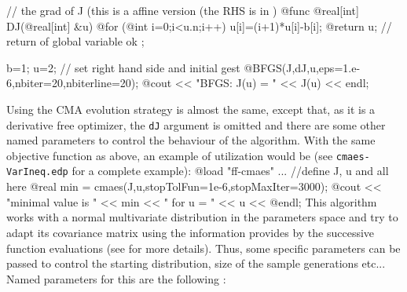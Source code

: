 \documentclass[a4paper,twoside,12pt]{book}
\begin{document}
//  the grad of J (this is a affine version (the RHS is in  )
  @func @real[int] DJ(@real[int] &u)
    {
      @for (@int i=0;i<u.n;i++)
        u[i]=(i+1)*u[i]-b[i];
      @return u;  // return of global variable ok
    };

  b=1; u=2; // set  right hand side and initial gest
  @BFGS(J,dJ,u,eps=1.e-6,nbiter=20,nbiterline=20);
  @cout << "BFGS: J(u) = " << J(u) << endl;

\eFF

Using the CMA evolution strategy is almost the same, except that, as it is
a derivative free optimizer, the \texttt{dJ} argument is omitted and there are
some other named parameters to control the behaviour of the algorithm. With the same 
objective function as above, an example of utilization would be (see \texttt{cmaes-VarIneq.edp} for a complete example):
\bFF
  @load "ff-cmaes"
  ... //define J, u and all here
  @real min = cmaes(J,u,stopTolFun=1e-6,stopMaxIter=3000);
  @cout << "minimal value is " << min << " for u = " << u << @endl;
\eFF
This algorithm works with a normal multivariate distribution in the parameters
space and try to adapt its covariance matrix using the information provides by
the successive function evaluations (see \cite{hansen} for more details). Thus, some specific parameters can be passed
to control the starting distribution, size of the sample generations etc... Named parameters
for this are the following :
\end{document}

